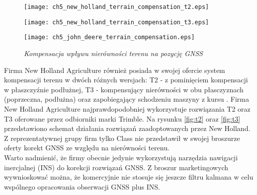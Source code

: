 \begin{figure}[H]
\centering
\begin{minipage}[c]{0.6\linewidth}
  \begin{flushleft}
  	\begin{minipage}[t]{0.5\linewidth}
		\raggedleft
		\texttt{[image: ch5\_new\_holland\_terrain\_compensation\_t2.eps]}	
		\label{fig:t2}
	\end{minipage}
	\vfill
	\begin{minipage}[b]{0.5\linewidth}
		\raggedleft
		\texttt{[image: ch5\_new\_holland\_terrain\_compensation\_t3.eps]}
		\label{fig:t3}
	\end{minipage}
  \end{flushleft}
\end{minipage}%
\hfill
\begin{minipage}[c]{0.4\linewidth}
  \begin{flushright}
  \texttt{[image: ch5\_john\_deere\_terrain\_compensation.eps]}
  \label{fig:john_deere_tcm}
  \end{flushright}
\end{minipage}
\caption{\textit{Kompensacja wpływu nierówności terenu na pozycję GNSS}}
\label{fig:terrain_compensation}
\end{figure}
Firma New Holland Agriculture również posiada w swojej ofercie system kompensacji terenu w dwóch różnych wersjach: T2 - z pominięciem kompensacji w 
płaszczyźnie podłużnej, T3 - kompensujący nierówności w obu płasczyznach (poprzeczna, podłużna) oraz zapobiegający schodzeniu maszyny z kursu \cite[][strona 7]{NEW_HOLLAND_PLM}.
Firma New Holland Agriculture najprawdopodobniej wykorzystuje rozwiązania T2 oraz T3 oferowane przez odbiorniki marki Trimble. 
Na rysunku \ref{fig:t2} oraz \ref{fig:t3} przedstawiono schemat działania rozwiązań zaadoptowanych przez New Holland.
Z reprezentatywnej grupy firm tylko Class nie przedstawił w swojej broszurze oferty korekt GNSS ze względu na nierówności terenu.\\
\indent Warto nadmienić, że firmy obecnie jedynie wykorzystują narzędzia nawigacji inercjalnej (INS) do korekcji rozwiązań GNSS.
Z broszur marketingowych wywnioskować można, że komercyjnie nie stosuje się jeszcze filtru kalmana w celu wspólnego opracowania obserwacji GNSS plus INS.
